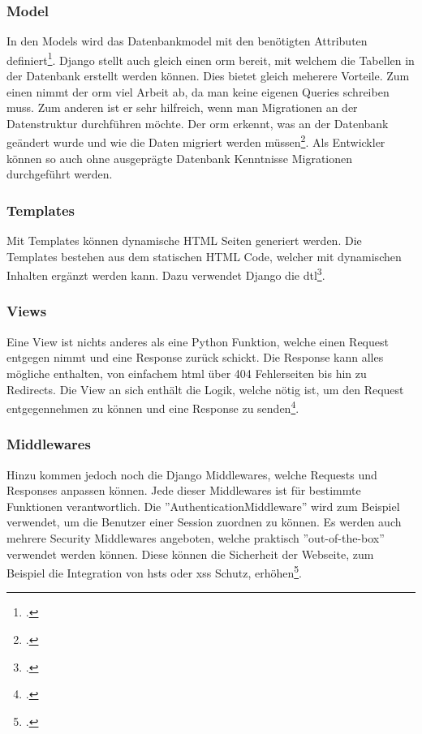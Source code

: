 \subsubsection*{Model}
In den Models wird das Datenbankmodel mit den benötigten Attributen definiert\footcite{django_models}. Django stellt auch gleich einen \gls{orm} bereit, mit welchem die Tabellen in der Datenbank erstellt werden können. Dies bietet gleich meherere Vorteile. Zum einen nimmt der \gls{orm} viel Arbeit ab, da man keine eigenen Queries schreiben muss. Zum anderen ist er sehr hilfreich, wenn man Migrationen an der Datenstruktur durchführen möchte. Der \gls{orm} erkennt, was an der Datenbank geändert wurde und wie die Daten migriert werden müssen\footcite{django_manage}. Als Entwickler können so auch ohne ausgeprägte Datenbank Kenntnisse Migrationen durchgeführt werden.

\subsubsection*{Templates}
Mit Templates können dynamische HTML Seiten generiert werden. Die Templates bestehen aus dem statischen HTML Code, welcher mit dynamischen Inhalten ergänzt werden kann.  Dazu verwendet Django die \gls{dtl}\footcite{django_templates}.

\subsubsection*{Views}
Eine View ist nichts anderes als eine Python Funktion, welche einen Request entgegen nimmt und eine Response zurück schickt. Die Response kann alles mögliche enthalten, von einfachem \gls{html} über 404 Fehlerseiten bis hin zu Redirects. Die View an sich enthält die Logik, welche nötig ist, um den Request entgegennehmen zu können und eine Response zu senden\footcite{django_views}.

\subsubsection*{Middlewares}
Hinzu kommen jedoch noch die Django Middlewares, welche Requests und Responses anpassen können. Jede dieser Middlewares ist für bestimmte Funktionen verantwortlich. Die ''AuthenticationMiddleware'' wird zum Beispiel verwendet, um die Benutzer einer Session zuordnen zu können. Es werden auch mehrere Security Middlewares angeboten, welche praktisch ''out-of-the-box'' verwendet werden können. Diese können die Sicherheit der Webseite, zum Beispiel die Integration von \gls{hsts} oder \gls{xss} Schutz, erhöhen\footcite{django_middlewares}.\\

